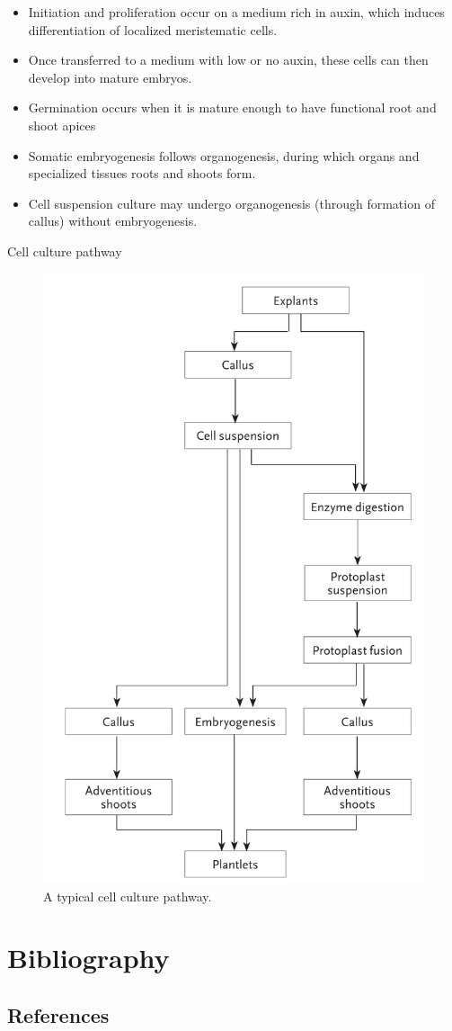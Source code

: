 \documentclass[
  ignorenonframetext,
  aspectratio=169]{beamer}
\providecommand{\tightlist}{%
  \setlength{\itemsep}{0pt}\setlength{\parskip}{0pt}}
\begin{document}
\begin{frame}{}
\protect\hypertarget{section-9}{}
\begin{itemize}
\tightlist
\item
  Initiation and proliferation occur on a medium rich in auxin, which
  induces differentiation of localized meristematic cells.
\item
  Once transferred to a medium with low or no auxin, these cells can
  then develop into mature embryos.
\item
  Germination occurs when it is mature enough to have functional root
  and shoot apices
\item
  Somatic embryogenesis follows organogenesis, during which organs and
  specialized tissues roots and shoots form.
\item
  Cell suspension culture may undergo organogenesis (through formation
  of callus) without embryogenesis.
\end{itemize}
\end{frame}

\begin{frame}{Cell culture pathway}
\protect\hypertarget{cell-culture-pathway}{}
\begin{figure}
\includegraphics[width=0.28\linewidth]{../images/cell-culture-flowchart} \caption{A typical cell culture pathway.}\label{fig:cell-culture-pathway}
\end{figure}
\end{frame}

\hypertarget{bibliography}{%
\section{Bibliography}\label{bibliography}}

\hypertarget{references}{%
\subsection{References}\label{references}}
\end{document}
